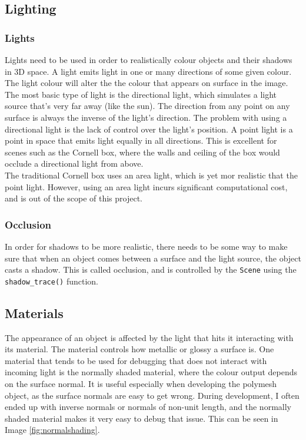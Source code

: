 \documentclass[a4paper]{article}
\begin{document}
\subsection{Lighting}
\subsubsection{Lights}
Lights need to be used in order to realistically colour objects and their shadows in 3D space. A light emits light in one or many directions of some given colour. The light colour will alter the the colour that appears on surface in the image.\\

The most basic type of light is the directional light, which simulates a light source that's very far away (like the sun). The direction from any point on any surface is always the inverse of the light's direction. The problem with using a directional light is the lack of control over the light's position. A point light is a point in space that emits light equally in all directions. This is excellent for scenes such as the Cornell box, where the walls and ceiling of the box would occlude a directional light from above.\\

The traditional Cornell box uses an area light, which is yet mor realistic that the point light. However, using an area light incurs significant computational cost, and is out of the scope of this project.\\

\subsubsection{Occlusion}
In order for shadows to be more realistic, there needs to be some way to make sure that when an object comes between a surface and the light source, the object casts a shadow. This is called occlusion, and is controlled by the \texttt{Scene} using the \texttt{shadow\_trace()} function.\\

\subsection{Materials}
The appearance of an object is affected by the light that hits it interacting with its material. The material controls how metallic or glossy a surface is. One material that tends to be used for debugging that does not interact with incoming light is the normally shaded material, where the colour output depends on the surface normal. It is useful especially when developing the polymesh object, as the surface normals are easy to get wrong. During development, I often ended up with inverse normals or normals of non-unit length, and the normally shaded material makes it very easy to debug that issue. This can be seen in Image \ref{fig:normalshading}.\\
\end{document}
